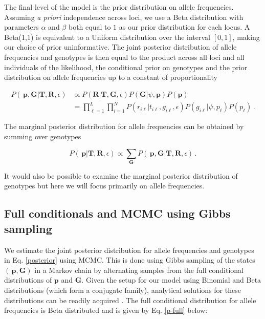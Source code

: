 \documentclass[11pt,english,letterpaper,oneside]{article}
\begin{document}
The final level of the model is the prior distribution on allele frequencies. Assuming \textit{a priori} independence across loci, we use a Beta distribution with parameters $\alpha$ and $\beta$ both equal to $1$ as our prior distribution for each locus. A Beta(1,1) is equivalent to a Uniform distribution over the interval $[0,1]$, making our choice of prior uninformative. The joint posterior distribution of allele frequencies and genotypes is then equal to the product across all loci and all individuals of the likelihood, the conditional prior on genotypes and the prior distribution on allele frequencies up to a constant of proportionality

\begin{align}\label{posterior}
P(\,\bm{p},\bm{G}|\bm{T}, \bm{R},\epsilon) &\propto P(\bm{R}|\bm{T},\bm{G}, \epsilon)P(\bm{G}|\psi,\bm{p})P(\bm{p}) \nonumber \\[0.05in]
&= \displaystyle\prod_{\ell=1}^L\displaystyle\prod_{i=1}^N P(r_{i \ell}|t_{i\ell}, g_{i \ell},\epsilon)P(g_{i \ell}|\psi, p_{\ell})P(p_{\ell})\,.
\end{align}

\noindent The marginal posterior distribution for allele frequencies can be obtained by summing over genotypes

\begin{equation}\label{marg_post_p}
P(\,\bm{p}|\bm{T}, \bm{R},\epsilon) \propto \displaystyle\sum_{\bm{G}} P(\,\bm{p},\bm{G}|\bm{T}, \bm{R},\epsilon)\,.
\end{equation}

\noindent It would also be possible to examine the marginal posterior distribution of genotypes but here we will focus primarily on allele frequencies.

\medskip
\subsection{Full conditionals and MCMC using Gibbs sampling} %
\medskip

\noindent We estimate the joint posterior distribution for allele frequencies and genotypes in Eq. \ref{posterior} using MCMC. This is done using Gibbs sampling of the states $(\,\bm{p},\bm{G})$ in a Markov chain by alternating samples from the full conditional distributions of $\bm{p}$ and $\bm{G}$. Given the setup for our model using Binomial and Beta distributions (which form a conjugate family), analytical solutions for these distributions can be readily acquired \citep{gelman2014bayesian}. The full conditional distribution for allele frequencies is Beta distributed and is given by Eq. \ref{p-full} below:
\end{document}
